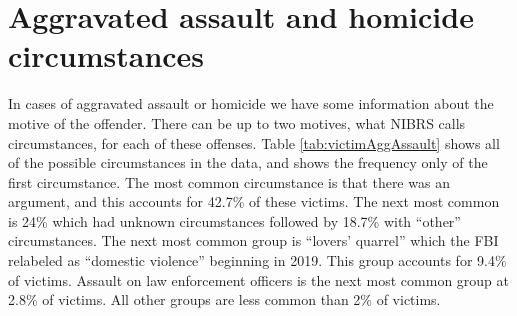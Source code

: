 \documentclass[
]{krantz}
\begin{document}
\section{Aggravated assault and homicide
circumstances}\label{aggravated-assault-and-homicide-circumstances}

In cases of aggravated assault or homicide we have some
information about the motive of the offender. There can be
up to two motives, what NIBRS calls circumstances, for each
of these offenses. Table \ref{tab:victimAggAssault} shows
all of the possible circumstances in the data, and shows the
frequency only of the first circumstance. The most common
circumstance is that there was an argument, and this
accounts for 42.7\% of these victims. The next most common
is 24\% which had unknown circumstances followed by 18.7\%
with ``other'' circumstances. The next most common group is
``lovers' quarrel'' which the FBI relabeled as ``domestic
violence'' beginning in 2019. This group accounts for 9.4\%
of victims. Assault on law enforcement officers is the next
most common group at 2.8\% of victims. All other groups are
less common than 2\% of victims.
\end{document}
